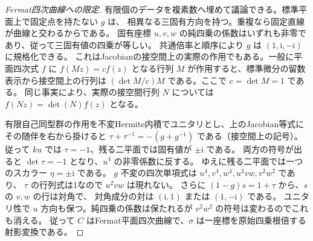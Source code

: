\begin{proof}[Fermat四次曲線への限定]
有限個のデータを複素数へ埋めて議論できる。標準平面上で固定点を持たない $g$ は、
相異なる三固有方向を持つ。重複なら固定直線が曲線と交わるからである。
固有座標 $u,v,w$ の純四乗の係数はいずれも非零であり、従って三固有値の四乗が等しい。
共通倍率と順序により $g$ は $(1,\mathrm i,-\mathrm i)$ に規格化できる。
これはJacobianの接空間上の実際の作用でもある。一般に平面四次式 $f$ に
$f(Mz)=c f(z)$ となる行列 $M$ が作用すると、標準微分の留数表示から接空間上の行列は
$(\det M/c)M$ である。ここで $c=\det M=1$ である。
同じ事実により、実際の接空間行列 $N$ については $f(Nz)=\det(N) f(z)$ となる。

有限自己同型群の作用を不変Hermite内積でユニタリとし、上のJacobian等式に
その随伴を右から掛けると $\tau+\tau^{-1}=-(g+g^{-1})$ である（接空間上の記号）。
従って $ku$ では $\tau=-1$、残る二平面では固有値が $\pm\mathrm i$ である。
両方の符号が出ると $\det\tau=-1$ となり、$u^4$ の非零係数に反する。
ゆえに残る二平面では一つのスカラー $\eta=\pm\mathrm i$ である。
$g$ 不変の四次単項式は $u^4,v^4,w^4,u^2vw,v^2w^2$ であり、
$\tau$ の行列式は1なので $u^2vw$ は現れない。
さらに $(1-g)s=1+\tau$ から、$s$ の $v,w$ の行は対角で、
対角成分の対は $(\mathrm i,1)$ または $(1,-\mathrm i)$ である。
ユニタリ性で $u$ 方向も保つ。純四乗の係数は保たれるが $v^2w^2$ の符号は変わるのでこれも消える。
従って $C$ はFermat平面四次曲線で、$\sigma$ は一座標を原始四乗根倍する射影変換である。
\end{proof}

